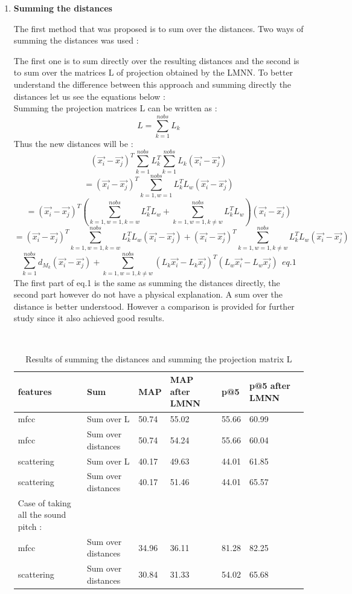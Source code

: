 \documentclass[hidelinks,12pt]{report}
\begin{document}
\begin{enumerate}
\item \textbf{Summing the distances} \par 
The first method that was proposed is to sum over the distances. Two ways of summing the distances was used :\par The first one is to sum directly over the resulting distances and the second is to sum over the matrices L of projection obtained by the LMNN. To better understand the difference between this approach and summing directly the distances let us see the equations below : \\
Summing the projection matrices L can be written as :
$$L=\sum_{k=1}^{nobs}L_k$$
Thus the new distances will be :
 $$(\vec{x_i}-\vec{x_j})^T\sum_{k=1}^{nobs}L_k^T\sum_{k=1}^{nobs}L_k(\vec{x_i}-\vec{x_j})$$
  $$=(\vec{x_i}-\vec{x_j})^T\sum_{k=1,w=1}^{nobs}L_k^TL_w(\vec{x_i}-\vec{x_j})$$
  $$=(\vec{x_i}-\vec{x_j})^T(\sum_{k=1,w=1,k=w}^{nobs}L_k^TL_w+\sum_{k=1,w=1,k\neq w}^{nobs}L_k^TL_w)(\vec{x_i}-\vec{x_j})$$
   $$=(\vec{x_i}-\vec{x_j})^T\sum_{k=1,w=1,k=w}^{nobs}L_k^TL_w(\vec{x_i}-\vec{x_j})+(\vec{x_i}-\vec{x_j})^T\sum_{k=1,w=1,k\neq w}^{nobs}L_k^TL_w(\vec{x_i}-\vec{x_j})$$
  $$\sum_{k=1}^{nobs}d_{M_k}(\vec{x_i}-\vec{x_j})+\sum_{k=1,w=1,k\neq w}^{nobs}(L_k\vec{x_i}-L_k\vec{x_j})^T(L_w\vec{x_i}-L_w\vec{x_j})\ \ eq.1$$
 The first part of eq.1 is the same as summing the distances directly, the second part however do not have a physical explanation. A sum over the distance is better understood. However a comparison is provided for further study since it also achieved good results.
 
 \begin{table}[H]
\begin{center} 
\ 
 \setlength{\tabcolsep}{.16667em} 
\begin{tabular}{ | l | l | l | l | l | l | l |} 
\hline
features & Sum & MAP & MAP after LMNN & p@5 & p@5 after LMNN  \\ 
\hline 
mfcc & Sum over L& 50.74 &55.02 & 55.66 & 60.99 \\ 
mfcc & Sum over distances & 50.74 & 54.24 & 55.66 & 60.04  \\ 
scattering& Sum over L & 40.17 & 49.63 & 44.01 & 61.85  \\ 
scattering & Sum over distances & 40.17 & 51.46 & 44.01 & 65.57  \\
\hline Case of taking all the sound pitch :
\\
\hline

mfcc & Sum over distances & 34.96 &36.11 & 81.28 & 82.25  \\ 
scattering & Sum over distances & 30.84 &    31.33 & 54.02  & 65.68  \\
\hline
\end{tabular} 
\end{center} 
\caption{Results of summing the distances and summing the projection matrix L} 
\label{you} 
\end{table}
 

\end{enumerate}
\end{document}
